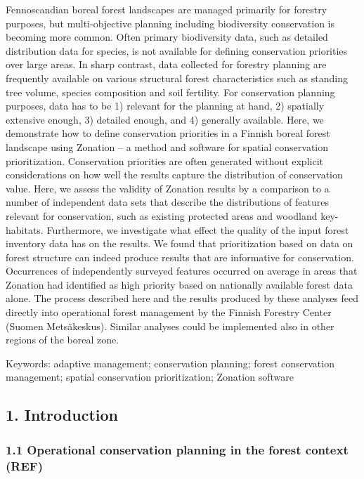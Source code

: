 \documentclass[]{article}
\begin{document}
Fennoscandian boreal forest landscapes are managed primarily for
forestry purposes, but multi-objective planning including biodiversity
conservation is becoming more common. Often primary biodiversity data,
such as detailed distribution data for species, is not available for
defining conservation priorities over large areas. In sharp contrast,
data collected for forestry planning are frequently available on various
structural forest characteristics such as standing tree volume, species
composition and soil fertility. For conservation planning purposes, data
has to be 1) relevant for the planning at hand, 2) spatially extensive
enough, 3) detailed enough, and 4) generally available. Here, we
demonstrate how to define conservation priorities in a Finnish boreal
forest landscape using Zonation -- a method and software for spatial
conservation prioritization. Conservation priorities are often generated
without explicit considerations on how well the results capture the
distribution of conservation value. Here, we assess the validity of
Zonation results by a comparison to a number of independent data sets
that describe the distributions of features relevant for conservation,
such as existing protected areas and woodland key-habitats. Furthermore,
we investigate what effect the quality of the input forest inventory
data has on the results. We found that prioritization based on data on
forest structure can indeed produce results that are informative for
conservation. Occurrences of independently surveyed features occurred on
average in areas that Zonation had identified as high priority based on
nationally available forest data alone. The process described here and
the results produced by these analyses feed directly into operational
forest management by the Finnish Forestry Center (Suomen Metsäkeskus).
Similar analyses could be implemented also in other regions of the
boreal zone.

Keywords: adaptive management; conservation planning; forest
conservation management; spatial conservation prioritization; Zonation
software

\subsection{1. Introduction}

\subsubsection{1.1 Operational conservation planning in the forest
context (REF)}
\end{document}
